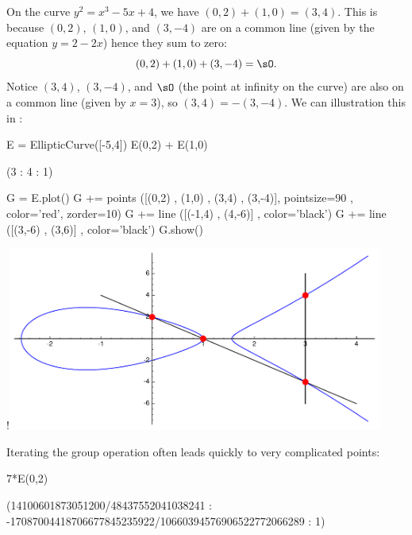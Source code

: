 \begin{example}\label{ex:ecgplaw}
  On the curve $y^2=x^3-5x+4$, we have $(0,2) + (1,0) = (3,4)$.
  This is because $(0,2)$, $(1,0)$, and $(3,-4)$ are on a common line
  (given by the equation $y = 2 - 2x$) hence they sum to zero:
  \[
    (0,2) + (1,0) + (3,-4) = \sO.
  \]
  Notice $(3,4)$, $(3,-4)$, and $\sO$ (the point at infinity on the curve)
  are also on a common line (given by $x = 3$), so $(3,4)=-(3,-4)$.
  We can illustration this in {\Sage}:
\begin{sagecode}
\begin{sagecell}
E = EllipticCurve([-5,4])
E(0,2) + E(1,0)
\end{sagecell}
\begin{sageout}
(3 : 4 : 1)
\end{sageout}
\end{sagecode} %
\begin{sagecode}
\begin{sagecell} %
G = E.plot()
G += points ([(0,2) , (1,0) , (3,4) , (3,-4)],
pointsize=90 , color='red', zorder=10)
G += line ([(-1,4) , (4,-6)] , color='black')
G += line ([(3,-6) , (3,6)] , color='black')
G.show()
\end{sagecell}
\begin{sageout}[escapechar=!] %
!\includegraphics[width=0.925\textwidth]{img/grouplaw}
\end{sageout}
\end{sagecode} %

  \noindent
  Iterating the group operation often leads quickly to
  very complicated points:

\begin{sagecode}
\begin{sagecell}
7*E(0,2)
\end{sagecell}
\begin{sageout}
(14100601873051200/48437552041038241 :
-17087004418706677845235922/10660394576906522772066289 :
1)
\end{sageout}
\end{sagecode}
\end{example}

